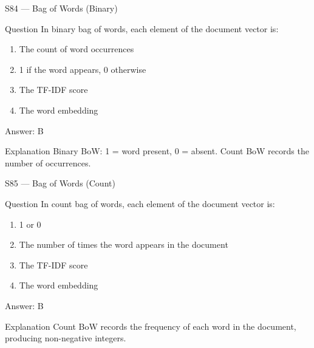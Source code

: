 \documentclass[aspectratio=169,8pt]{beamer}
\begin{document}
	\begin{frame}{S84 --- Bag of Words (Binary)}
		\begin{block}{Question}
			In binary bag of words, each element of the document vector is:
			\begin{enumerate}
				\item The count of word occurrences
				\item 1 if the word appears, 0 otherwise
				\item The TF-IDF score
				\item The word embedding
			\end{enumerate}
		\end{block}
		\begin{exampleblock}{Answer: B}\end{exampleblock}
		\begin{block}{Explanation}
			Binary BoW: 1 = word present, 0 = absent. Count BoW records the number of occurrences.
		\end{block}
	\end{frame}
	
	\begin{frame}{S85 --- Bag of Words (Count)}
		\begin{block}{Question}
			In count bag of words, each element of the document vector is:
			\begin{enumerate}
				\item 1 or 0
				\item The number of times the word appears in the document
				\item The TF-IDF score
				\item The word embedding
			\end{enumerate}
		\end{block}
		\begin{exampleblock}{Answer: B}\end{exampleblock}
		\begin{block}{Explanation}
			Count BoW records the frequency of each word in the document, producing non-negative integers.
		\end{block}
	\end{frame}
	
\end{document}
